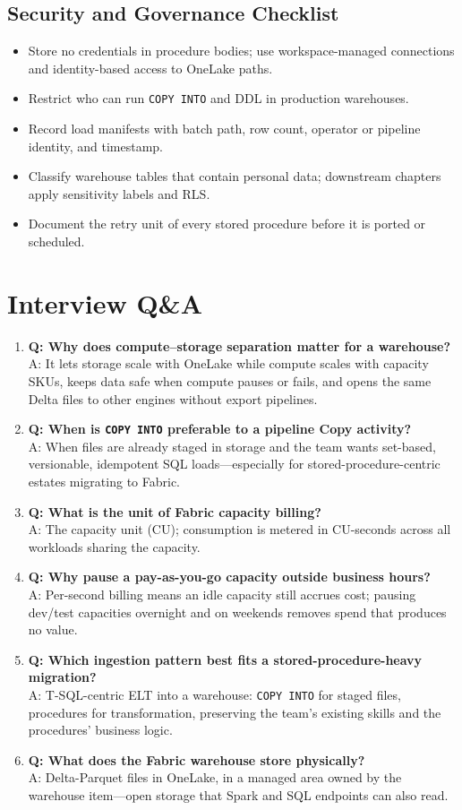 \subsection{Security and Governance Checklist}
\begin{itemize}
    \item Store no credentials in procedure bodies; use workspace-managed connections and identity-based access to OneLake paths.
    \item Restrict who can run \texttt{COPY INTO} and DDL in production warehouses.
    \item Record load manifests with batch path, row count, operator or pipeline identity, and timestamp.
    \item Classify warehouse tables that contain personal data; downstream chapters apply sensitivity labels and RLS.
    \item Document the retry unit of every stored procedure before it is ported or scheduled.
\end{itemize}

\section{Interview Q\&A}
\begin{enumerate}
    \item \textbf{Q: Why does compute--storage separation matter for a warehouse?}\\
    A: It lets storage scale with OneLake while compute scales with capacity SKUs, keeps data safe when compute pauses or fails, and opens the same Delta files to other engines without export pipelines.
    \item \textbf{Q: When is \texttt{COPY INTO} preferable to a pipeline Copy activity?}\\
    A: When files are already staged in storage and the team wants set-based, versionable, idempotent SQL loads---especially for stored-procedure-centric estates migrating to Fabric.
    \item \textbf{Q: What is the unit of Fabric capacity billing?}\\
    A: The capacity unit (CU); consumption is metered in CU-seconds across all workloads sharing the capacity.
    \item \textbf{Q: Why pause a pay-as-you-go capacity outside business hours?}\\
    A: Per-second billing means an idle capacity still accrues cost; pausing dev/test capacities overnight and on weekends removes spend that produces no value.
    \item \textbf{Q: Which ingestion pattern best fits a stored-procedure-heavy migration?}\\
    A: T-SQL-centric ELT into a warehouse: \texttt{COPY INTO} for staged files, procedures for transformation, preserving the team's existing skills and the procedures' business logic.
    \item \textbf{Q: What does the Fabric warehouse store physically?}\\
    A: Delta-Parquet files in OneLake, in a managed area owned by the warehouse item---open storage that Spark and SQL endpoints can also read.
\end{enumerate}


